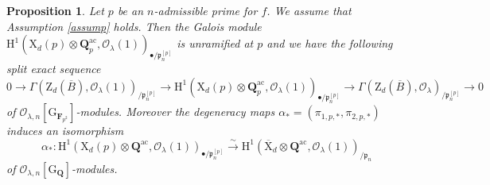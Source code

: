 \documentclass[10pt]{amsart}
\numberwithin{equation}{section}
\theoremstyle{plain}
\newtheorem{proposition}[theorem]{Proposition}
\numberwithin{equation}{section}
\theoremstyle{definition}
\theoremstyle{remark}
\def\ac{\mathrm{ac}}
\def\Qbar{\QQ^{\ac}}
\def\ac{\mathrm{ac}}
\def\calO{\mathcal{O}}
\def\frakp{\mathfrak{p}}
\def\FF{\mathbf{F}}
\def\QQ{\mathbf{Q}}
\def\rmG{\mathrm{G}}
\def\rmH{\mathrm{H}}
\def\rmX{\mathrm{X}}
\def\rmZ{\mathrm{Z}}
\begin{document}
\begin{proposition}\label{new-old-quotient}
Let $p$ be an $n$-admissible prime for $f$.  We assume that Assumption \ref{assump} holds. Then the Galois module $\rmH^{1}({\rmX}_{d}(p)\otimes{\QQ^{\ac}_{p}}, \calO_{\lambda}(1))_{\bullet/\frakp^{[p]}_{n}}$ is unramified at $p$ and we have the following split exact sequence
\begin{equation*}
0\rightarrow\Gamma(\rmZ_{d}(\overline{B}), \calO_{\lambda}(1))_{/\frakp^{[p]}_{n}}\rightarrow \rmH^{1}({\rmX}_{d}(p)\otimes{\QQ^{\ac}_{p}}, \calO_{\lambda}(1))_{\bullet/\frakp^{[p]}_{n}}\rightarrow \Gamma(\rmZ_{d}(\overline{B}), \calO_{\lambda})_{/\frakp^{[p]}_{n}}\rightarrow0
\end{equation*}
of $\calO_{\lambda, n}[\rmG_{\FF_{p^{2}}}]$-modules. Moreover the degeneracy maps $\alpha_{\ast}=(\pi_{1,p,\ast}, \pi_{2,p,\ast})$ induces an isomorphism 
\begin{equation*}
\alpha_{\ast}: \rmH^{1}(\rmX_{d}(p)\otimes{\Qbar}, \calO_{\lambda}(1))_{\bullet/\frakp^{[p]}_{n}}\xrightarrow{\sim}\rmH^{1}(\overline{\rmX}_{d}\otimes{\Qbar}, \calO_{\lambda}(1))_{/\frakp_{n}}
\end{equation*}
of $\calO_{\lambda, n}[\rmG_{\QQ}]$-modules.
\end{proposition}
\end{document}
